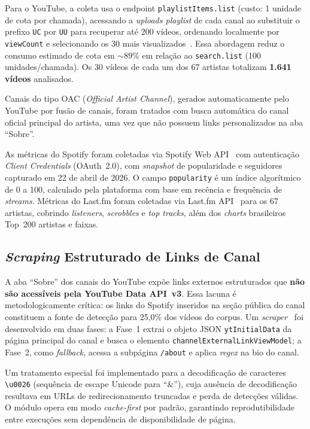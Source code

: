 ﻿\documentclass[12pt]{article}
\begin{document}
Para o YouTube, a coleta usa o endpoint \texttt{playlistItems.list}
(custo: 1 unidade de cota por chamada), acessando a \textit{uploads playlist}
de cada canal ao substituir o prefixo \texttt{UC} por \texttt{UU} para
recuperar até 200 vídeos, ordenando localmente por \texttt{viewCount} e
selecionando os 30 mais visualizados~\cite{youtubeapi2024}. Essa abordagem
reduz o consumo estimado de cota em ${\sim}89\%$ em relação ao
\texttt{search.list} (100 unidades/chamada). Os 30 vídeos de cada um dos
67 artistas totalizam \textbf{1.641 vídeos} analisados.

Canais do tipo OAC (\textit{Official Artist Channel}), gerados
automaticamente pelo YouTube por fusão de canais, foram tratados com busca
automática do canal oficial principal do artista, uma vez que não possuem
links personalizados na aba ``Sobre''.

As métricas do Spotify foram coletadas via Spotify Web
API~\cite{spotifyapi2024} com autenticação \textit{Client Credentials}
(OAuth~2.0), com \textit{snapshot} de popularidade e seguidores capturado em
22 de abril de 2026. O campo \texttt{popularity} é um índice algorítmico de
0 a 100, calculado pela plataforma com base em recência e frequência de
\textit{streams}. Métricas do Last.fm foram coletadas via Last.fm
API~\cite{lastfmapi2024} para os 67 artistas, cobrindo \textit{listeners},
\textit{scrobbles} e \textit{top tracks}, além dos \textit{charts} brasileiros
Top~200 artistas e faixas.

\subsection{\textit{Scraping} Estruturado de Links de Canal}

A aba ``Sobre'' dos canais do YouTube expõe links externos estruturados que
\textbf{não são acessíveis pela YouTube Data API~v3}. Essa lacuna é
metodologicamente crítica: os links do Spotify inseridos na seção pública
do canal constituem a fonte de detecção para 25,0\% dos vídeos do corpus. Um
\textit{scraper}~\cite{mitchell2018} foi desenvolvido em duas fases: a Fase~1
extrai o objeto JSON \texttt{ytInitialData} da página principal do canal e
busca o elemento \texttt{channelExternalLinkViewModel}; a Fase~2, como
\textit{fallback}, acessa a subpágina \texttt{/about} e aplica
\textit{regex} na bio do canal.

Um tratamento especial foi implementado para a decodificação de caracteres
\texttt{\textbackslash u0026} (sequência de escape Unicode para ``\&''), cuja
ausência de decodificação resultava em URLs de redirecionamento truncadas e
perda de detecções válidas. O módulo opera em modo \textit{cache-first} por
padrão, garantindo reprodutibilidade entre execuções sem dependência de
disponibilidade de página.
\end{document}

